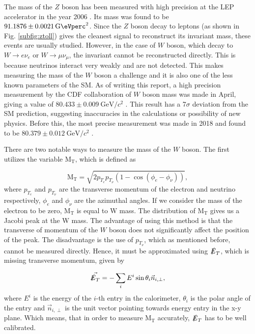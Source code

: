 \documentclass[a4paper]{report}
\numberwithin{equation}{section}
\begin{document}
The mass of the $Z$ boson has been measured with high precision at the LEP accelerator in the year 2006 \cite{ALEPH:2005ab}. Its mass was found to be $\SI[per-mode=symbol]{91.1876 \pm 0.0021}{\giga\eVperc\squared}$. Since the $Z$ boson decay to leptons (as shown in Fig. \ref{subfig:ztoll}) gives the cleanest signal to reconstruct its invariant mass, these events are usually studied. However, in the case of $W$ boson, which decay to $W \rightarrow e\nu_e$ or $W \rightarrow \mu \nu_{\mu}$, the invariant cannot be reconstructed directly. This is because neutrinos interact very weakly and are not detected. This makes measuring the mass of the $W$ boson a challenge and it is also one of the less known parameters of the SM. As of writing this report, a high precision measurement by the CDF collaboration of $W$ boson mass was made in April, giving a value of $80.433 \pm 0.009 \ \text{GeV}/c^2$ \cite{CDF:2022hxs}. This result has a 7$\sigma$ deviation from the SM prediction, suggesting inaccuracies in the calculations or possibility of new physics. Before this, the most precise measurement was made in 2018 and found to be $80.379 \pm 0.012 \ \text{GeV}/c^2$ \cite{PhysRevD.98.030001}. 

There are two notable ways to measure the mass of the $W$ boson. The first utilizes the variable $\text{M}_\text{T}$, which is defined as

\begin{equation}
\mathrm{M_T} = \sqrt{2 p_{T_e} p_{T_{\nu}} (1 - \cos(\phi_e - \phi_{\nu}))},
\end{equation}
where $p_{T_e}$ and $p_{T_{\nu}}$ are the transverse momentum of the electron and neutrino respectively, $\phi_e$ and $\phi_{\nu}$ are the azimuthal angles. If we consider the mass of the electron to be zero, $\mathrm{M_T}$ is equal to W mass. The distribution of $\mathrm{M_T}$ gives us a Jacobi peak at the W mass. The advantage of using this method is that the transverse of momentum of the $W$ boson does not significantly affect the position of the peak. The disadvantage is the use of $p_{T_{\nu}}$, which as mentioned before, cannot be measured directly. Hence, it must be approximated using $\slashed{E}_T$, which is missing transverse momentum, given by

\begin{equation}
	\vec{\slashed{E}_T}	= - \sum_{i} E^i \sin \theta_i \vec{n}_{i, \perp},
\end{equation}
where $E^i$ is the energy of the $i$-th entry in the calorimeter, $\theta_i$ is the polar angle of the entry and $\vec{n}_{i, \perp}$ is the unit vector pointing towards energy entry in the x-y plane. Which means, that in order to measure $\mathrm{M_T}$ accurately, $\slashed{E}_T$ has to be well calibrated. 
\end{document}
